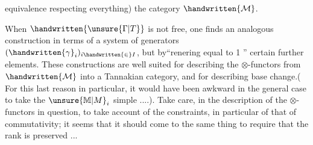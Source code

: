 equivalence\deleted{)} respecting everything) the category $\handwritten{\mathcal{M}}$.

When $\handwritten{\unsure{\Gamma|T}}$ is not free, one finds an analogous construction in terms of a  system of generators $(\handwritten{\gamma}_i)_{i\handwritten{\in}I}$, but by``renering  equal to 1 '' certain further elements. These constructions are well suited for describing the $\otimes$-functors from $\handwritten{\mathcal{M}}$ into a Tannakian \deleted{$\otimes$-}category, and for describing base change.( For this last reason in particular, it would have been awkward in the general case to take the $\unsure{\mathbb{M}|M}_i$ simple ....). Take care, in the description of the $\otimes$-functors in question, to take account of the constraints, in particular of that of commutativity; it seems that it should come to the same thing to require that the rank is preserved ...
